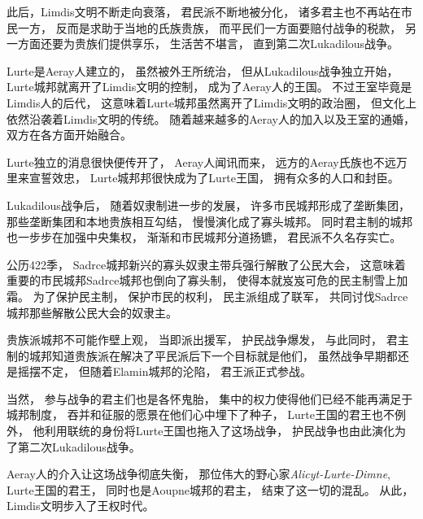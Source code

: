 \documentclass[UTF8,12pt,draft]{ctexbook}
\begin{document}
            此后，Limdis文明不断走向衰落，
            君民派不断地被分化，
            诸多君主也不再站在市民一方，
            反而是求助于当地的氏族贵族，
            而平民们一方面要赔付战争的税款，
            另一方面还要为贵族们提供享乐，
            生活苦不堪言，
            直到第二次Lukadilous战争。

            Lurte是Aeray人建立的，
            虽然被外王所统治，
            但从Lukadilous战争独立开始，
            Lurte城邦就离开了Limdis文明的控制，
            成为了Aeray人的王国。
            不过王室毕竟是Limdis人的后代，
            这意味着Lurte城邦虽然离开了Limdis文明的政治圈，
            但文化上依然沿袭着Limdis文明的传统。
            随着越来越多的Aeray人的加入以及王室的通婚，
            双方在各方面开始融合。

            Lurte独立的消息很快便传开了，
            Aeray人闻讯而来，
            远方的Aeray氏族也不远万里来宣誓效忠，
            Lurte城邦邦很快成为了Lurte王国，
            拥有众多的人口和封臣。

            Lukadilous战争后，
            随着奴隶制进一步的发展，
            许多市民城邦形成了垄断集团，
            那些垄断集团和本地贵族相互勾结，
            慢慢演化成了寡头城邦。
            同时君主制的城邦也一步步在加强中央集权，
            渐渐和市民城邦分道扬镳，
            君民派不久名存实亡。

            公历422季，
            Sadrce城邦新兴的寡头奴隶主带兵强行解散了公民大会，
            这意味着重要的市民城邦Sadrce城邦也倒向了寡头制，
            使得本就岌岌可危的民主制雪上加霜。
            为了保护民主制，
            保护市民的权利，
            民主派组成了联军，
            共同讨伐Sadrce城邦那些解散公民大会的奴隶主。

            贵族派城邦不可能作壁上观，
            当即派出援军，
            护民战争爆发，
            与此同时，
            君主制的城邦知道贵族派在解决了平民派后下一个目标就是他们，
            虽然战争早期都还是摇摆不定，
            但随着Elamin城邦的沦陷，
            君王派正式参战。

            当然，
            参与战争的君主们也是各怀鬼胎，
            集中的权力使得他们已经不能再满足于城邦制度，
            吞并和征服的愿景在他们心中埋下了种子，
            Lurte王国的君王也不例外，
            他利用联统的身份将Lurte王国也拖入了这场战争，
            护民战争也由此演化为了第二次Lukadilous战争。

            Aeray人的介入让这场战争彻底失衡，
            那位伟大的野心家\emph{Alicyt-Lurte-Dimne},
            Lurte王国的君王，
            同时也是Aoupne城邦的君主，
            结束了这一切的混乱。
            从此，
            Limdis文明步入了王权时代。
\end{document}
